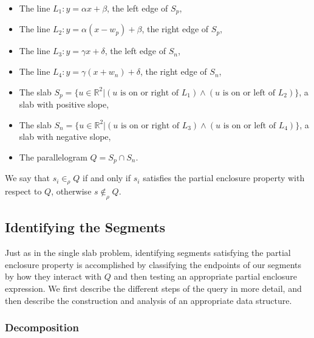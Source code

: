 \begin{itemize}
 \item The line $L_1 : y = \alpha x + \beta$, the left edge of $S_p$,

 \item The line $L_2 : y = \alpha (x - w_p) + \beta$, the right edge of $S_p$,

 \item The line $L_3 : y = \gamma x + \delta$, the left edge of $S_n$,

 \item The line $L_4 : y = \gamma (x + w_n) + \delta$, the right edge of $S_n$,

 \item The slab $S_p = \{ u \in \mathbb{R}^2 | (u \text{ is on or right of } L_1) \wedge (u \text{ is on or left of } L_2) \}$, a slab with positive slope,

 \item The slab $S_n = \{ u \in \mathbb{R}^2 | (u \text{ is on or right of } L_3) \wedge (u \text{ is on or left of } L_4) \}$, a slab with negative slope,

 \item The parallelogram $Q = S_p \cap S_n$.

\end{itemize}

We say that $s_i \in_\rho Q$ if and only if $s_i$ satisfies the partial enclosure property with respect to $Q$, otherwise $s \not \in_\rho Q$.


\subsection{Identifying the Segments}
\label{:slabs:two:approach}

Just as in the single slab problem, identifying segments satisfying the partial enclosure property is accomplished by classifying the endpoints of our segments by how they interact with $Q$ and then testing an appropriate partial enclosure expression. 
We first describe the different steps of the query in more detail, and then describe the construction and analysis of an appropriate data structure.


\subsubsection{Decomposition}

